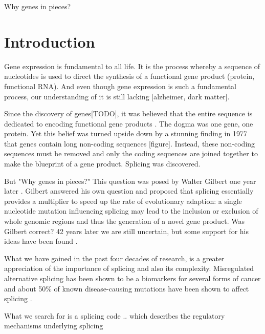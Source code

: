 \begin{savequote}[8cm]
Why genes in pieces?
\end{savequote}

\chapter{\label{ch:1-intro}Introduction} 
Gene expression is fundamental to all life. It is the process whereby a sequence of nucleotides is used to direct the synthesis of a functional gene product (protein, functional RNA). And even though gene expression is such a fundamental process, our understanding of it is still lacking [alzheimer, dark matter]. 

Since the discovery of genes[TODO], it was believed that the entire sequence is dedicated to encoding functional gene products \cite{onegeneoneprotein}. The dogma was one gene, one protein. Yet this belief was turned upside down by a stunning finding in 1977 that genes contain long non-coding sequences \cite{discoveryofsplicing} [figure]. Instead, these non-coding sequences must be removed and only the coding sequences are joined together to make the blueprint of a gene product. Splicing was discovered. 



But "Why genes in pieces?" This question was posed by Walter Gilbert one year later \cite{whygenesinpieces}. Gilbert answered his own question and proposed that splicing essentially provides a multiplier to speed up the rate of evolutionary adaption: a single nucleotide mutation influencing splicing may lead to the inclusion or exclusion of whole genomic regions and thus the generation of a novel gene product. Was Gilbert correct? 42 years later we are still uncertain, but some support for his ideas have been found \cite{whyrevisited}. %

What we have gained in the past four decades of research, is a greater appreciation of the importance of splicing and also its complexity. 
Misregulated alternative splicing has been shown to be a biomarkers for several forms of cancer \cite{cancer} \cite{splicingcausescancer} and about 50\% of known disease-causing mutations have been shown to affect splicing \cite{50diseasessplicing}. 

What we search for is a splicing code .. which describes the regulatory mechanisms underlying splicing 

